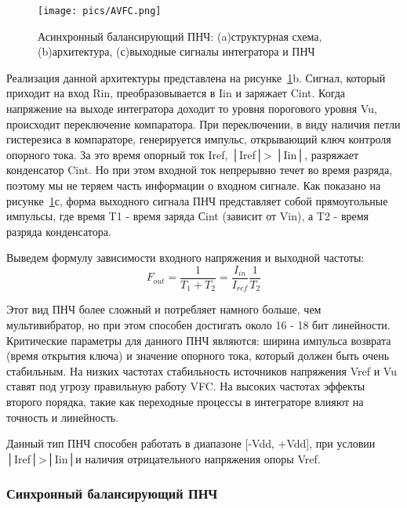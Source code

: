 \documentclass[a4paper,12pt,oneside]{scrartcl}
\begin{document}
\begin{figure}[!htb]
    \centering
    \texttt{[image: pics/AVFC.png]}
    \caption{Асинхронный балансирующий ПНЧ: (a)структурная схема, (b)архитектура, (с)выходные сигналы интегратора и ПНЧ}
    \label{fig:Avfc}
\end{figure}

Реализация данной архитектуры представлена на рисунке~\ref{fig:Avfc}b. Сигнал, который приходит на вход Rin, преобразовывается в Iin и заряжает Cint. Когда напряжение на выходе интегратора доходит то уровня порогового уровня Vu, происходит переключение компаратора. При переключении, в виду наличия петли гистерезиса в компараторе, генерируется импульс, открывающий ключ контроля опорного тока. За это время опорный ток Iref, │Iref│> │Iin│, разряжает конденсатор Cint. Но при этом входной ток непрерывно течет во время разряда, поэтому мы не теряем часть информации о входном сигнале. Как показано на рисунке~\ref{fig:Avfc}с, форма выходного сигнала ПНЧ представляет собой прямоугольные импульсы, где время T1 - время заряда Сint (зависит от Vin), а T2 - время разряда конденсатора. 

Выведем формулу зависимости входного напряжения и выходной частоты:
$$F_{out} = \frac{1}{T_{1} + T_{2}} = \frac{I_{in}}{I_{ref}}\frac{1}{T_{2}}$$

Этот вид ПНЧ более сложный и потребляет намного больше, чем мультивибратор, но при этом способен достигать около 16 - 18 бит линейности. Критические параметры для данного ПНЧ являются: ширина импульса возврата (время открытия ключа) и значение опорного тока, который должен быть очень стабильным. На низких частотах стабильность источников напряжения Vref и Vu ставят под угрозу правильную работу VFC. На высоких частотах эффекты второго порядка, такие как переходные процессы в интеграторе влияют на точность и линейность.

Данный тип ПНЧ способен работать в диапазоне [-Vdd, +Vdd], при условии │Iref│>│Iin│и наличия отрицательного напряжения опоры Vref. 








\subsubsection{Синхронный балансирующий ПНЧ}
\end{document}
